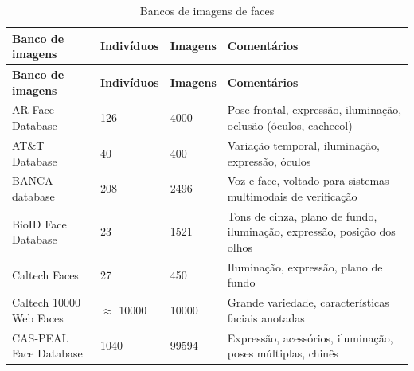\begin{longtabu} to 
\caption{Bancos de imagens de faces}
\label{tab:banco_faces}\\
\textbf{Banco de imagens}                                                            & \textbf{Indivíduos}  & \textbf{Imagens}                & \textbf{Comentários}                                                    \\\hline
\endfirsthead
\textbf{Banco de imagens}                                                            & \textbf{Indivíduos}  & \textbf{Imagens}                & \textbf{Comentários}                                                    \\\hline
\endhead
AR Face Database                                  \cite{martinez1998ar}              & 126                  & 4000                            & Pose frontal, expressão, iluminação, oclusão (óculos, cachecol)         \\\hline
AT\&T Database                                    \cite{samaria1994parameterisation} & 40                   & 400                             & Variação temporal, iluminação, expressão, óculos                        \\\hline
BANCA database                                    \cite{bailly2003banca}             & 208                  & 2496                            & Voz e face, voltado para sistemas multimodais de verificação            \\\hline
BioID Face Database                               \cite{jesorsky2001robust}          & 23                   & 1521                            & Tons de cinza, plano de fundo, iluminação, expressão, posição dos olhos \\\hline
Caltech Faces                                     \cite{weber1995caltech}            & 27                   & 450                             & Iluminação, expressão, plano de fundo                                   \\\hline
Caltech 10000 Web Faces                           \cite{angelova2005pruning}         & $\approx$ 10000      & 10000                           & Grande variedade, características faciais anotadas                      \\\hline
CAS-PEAL Face Database                            \cite{gao2008cas}                  & 1040                 & 99594                           & Expressão, acessórios, iluminação, poses múltiplas, chinês              \\\hline

\end{longtabu}
